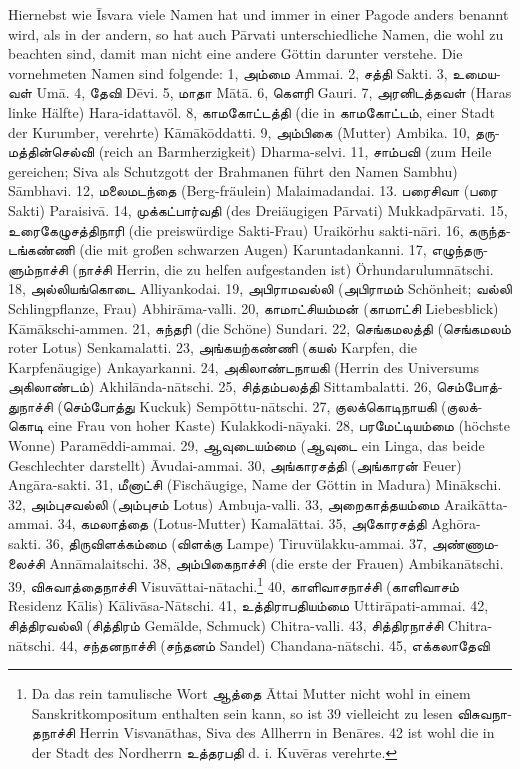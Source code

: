\documentclass{article}
\newcommand{\TamilText}[1]{\texttamil{#1}}
\newcommand{\tam}[1]{\TamilText{#1}}
\begin{document}
Hiernebst wie \={I}svara viele Namen hat und immer in einer Pagode anders benannt wird, als in der andern, so hat auch P\={a}rvati unterschiedliche Namen, die wohl zu beachten sind, damit man nicht eine andere Göttin darunter verstehe. Die vornehmeten Namen sind folgende: 1, \tam{அம்மை} Ammai. 2, \tam{சத்தி} Sakti. 3, \tam{உமையவள்} Um\={a}. 4, \tam{தேவி} D\={e}vi. 5, \tam{மாதா} M\={a}t\={a}. 6, \tam{கெளரி} Gauri. 7, \tam{அரனிடத்தவள்} (Haras linke Hälfte) Hara-idattavöl. 8, \tam{காமகோட்டத்தி} (die in \tam{காமகோட்டம்}, einer Stadt der Kurumber, verehrte) K\={a}m\={a}k\={o}ddatti. 9, \tam{அம்பிகை} (Mutter) Ambika. 10, \tam{தருமத்தின்செல்வி} (reich an Barmherzigkeit) Dharma-selvi. 11, \tam{சாம்பவி} (zum Heile gereichen; Siva als Schutzgott der Brahmanen führt den Namen Sambhu) S\={a}mbhavi. 12, \tam{மலைமடந்தை} (Berg-fräulein) Malaimadandai. 13. \tam{பரைசிவா} (\tam{பரை} Sakti) Paraisiv\={a}. 14, \tam{முக்கட்பார்வதி} (des Dreiäugigen P\={a}rvati) Mukkadp\={a}rvati. 15, \tam{உரைகேழுசத்திநாரி} (die preiswürdige Sakti-Frau) Uraikörhu sakti-n\={a}ri. 16, \tam{கருந்தடங்கண்ணி} (die mit großen schwarzen Augen) Karuntadankanni. 17, \tam{எழுந்தருளும்நாச்சி} (\tam{நாச்சி} Herrin, die zu helfen aufgestanden ist) Örhundarulumn\={a}tschi. 18, \tam{அல்லியங்கொடை} Alliyankodai. 19, \tam{அபிராமவல்லி} (\tam{அபிராமம்} Schönheit; \tam{வல்லி} Schlingpflanze, Frau) Abhir\={a}ma-valli. 20, \tam{காமாட்சியம்மன்} (\tam{காமாட்சி} Liebesblick) K\={a}m\={a}kschi-ammen. 21, \tam{சுந்தரி} (die Schöne) Sundari. 22, \tam{செங்கமலத்தி} (\tam{செங்கமலம்} roter Lotus) Senkamalatti. 23, \tam{அங்கயற்கண்ணி} (\tam{கயல்} Karpfen, die Karpfenäugige) Ankayarkanni. 24, \tam{அகிலாண்டநாயகி} (Herrin des Universums \tam{அகிலாண்டம்}) Akhil\={a}nda-n\={a}tschi. 25, \tam{சித்தம்பலத்தி} Sittambalatti. 26, \tam{செம்போத்துநாச்சி} (\tam{செம்போத்து} Kuckuk) Semp\={o}ttu-n\={a}tschi. 27, \tam{குலக்கொடிநாயகி} (\tam{குலக்கொடி} eine Frau von hoher Kaste) Kulakkodi-n\={a}yaki. 28, \tam{பரமேட்டியம்மை} (höchste Wonne) Param\={e}ddi-ammai. 29, \tam{ஆவுடையம்மை} (\tam{ஆவுடை} ein Linga, das beide Geschlechter darstellt) \={A}vudai-ammai. 30, \tam{அங்காரசத்தி} (\tam{அங்காரன்} Feuer) Ang\={a}ra-sakti. 31, \tam{மீனாட்சி} (Fischäugige, Name der Göttin in Madura) Min\={a}kschi. 32, \tam{அம்புசவல்லி} (\tam{அம்புசம்} Lotus) Ambuja-valli. 33, \tam{அறைகாத்தயம்மை} Araik\={a}tta-ammai. 34, \tam{கமலாத்தை} (Lotus-Mutter) Kamal\={a}ttai. 35, \tam{அகோரசத்தி} Agh\={o}ra-sakti. 36, \tam{திருவிளக்கம்மை} (\tam{விளக்கு} Lampe) Tiruvülakku-ammai. 37, \tam{அண்ணாமலைச்சி} Ann\={a}malaitschi. 38, \tam{அம்பிகைநாச்சி} (die erste der Frauen) Ambikan\={a}tschi. 39, \tam{விசுவாத்தைநாச்சி} Visuv\={a}ttai-n\={a}tachi.\footnote{Da das rein tamulische Wort \tam{ஆத்தை} \={A}ttai Mutter nicht wohl in einem Sanskritkompositum enthalten sein kann, so ist 39 vielleicht zu lesen \tam{விசுவநாதநாச்சி} Herrin Visvan\={a}thas, Siva des Allherrn in Ben\={a}res. 42 ist wohl die in der Stadt des Nordherrn \tam{உத்தரபதி} d. i. Kuv\={e}ras verehrte.} 40, \tam{காளிவாசநாச்சி} (\tam{காளிவாசம்} Residenz K\={a}lis) K\={a}liv\={a}sa-N\={a}tschi. 41, \tam{உத்திராபதியம்மை} Uttir\={a}pati-ammai. 42, \tam{சித்திரவல்லி} (\tam{சித்திரம்} Gemälde, Schmuck) Chitra-valli. 43, \tam{சித்திரநாச்சி} Chitra-n\={a}tschi. 44, \tam{சந்தனநாச்சி} (\tam{சந்தனம்} Sandel) Chandana-n\={a}tschi. 45, \tam{எக்கலாதேவி} 
\end{document}
